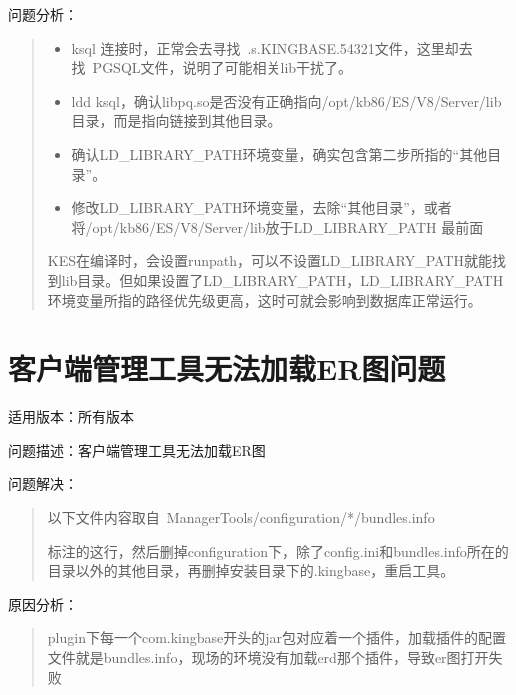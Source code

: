 \documentclass[letterpaper,10pt,english]{sphinxmanual}
\let\sphinxpxdimen\pdfpxdimen\else\newdimen\sphinxpxdimen
\begin{document}
问题分析：
\begin{quote}
\begin{itemize}
\item {} 
ksql 连接时，正常会去寻找 .s.KINGBASE.54321文件，这里却去找 PGSQL文件，说明了可能相关lib干扰了。

\item {} 
ldd ksql，确认libpq.so是否没有正确指向/opt/kb86/ES/V8/Server/lib目录，而是指向链接到其他目录。

\item {} 
确认LD\_LIBRARY\_PATH环境变量，确实包含第二步所指的“其他目录”。

\item {} 
修改LD\_LIBRARY\_PATH环境变量，去除“其他目录”，或者将/opt/kb86/ES/V8/Server/lib放于LD\_LIBRARY\_PATH 最前面

\end{itemize}

KES在编译时，会设置runpath，可以不设置LD\_LIBRARY\_PATH就能找到lib目录。但如果设置了LD\_LIBRARY\_PATH，LD\_LIBRARY\_PATH环境变量所指的路径优先级更高，这时可就会影响到数据库正常运行。
\end{quote}


\section{客户端管理工具无法加载ER图问题}
\label{\detokenize{tools:er}}
适用版本：所有版本

问题描述：客户端管理工具无法加载ER图

问题解决：
\begin{quote}

以下文件内容取自 ManagerTools/configuration/*/bundles.info

\begin{figure}[htbp]
\centering

\noindent\sphinxincludegraphics[width=650\sphinxpxdimen,height=148\sphinxpxdimen]{{FAQ28979}.png}
\end{figure}

标注的这行，然后删掉configuration下，除了config.ini和bundles.info所在的目录以外的其他目录，再删掉安装目录下的.kingbase，重启工具。
\end{quote}

原因分析：
\begin{quote}

plugin下每一个com.kingbase开头的jar包对应着一个插件，加载插件的配置文件就是bundles.info，现场的环境没有加载erd那个插件，导致er图打开失败
\end{quote}
\end{document}
